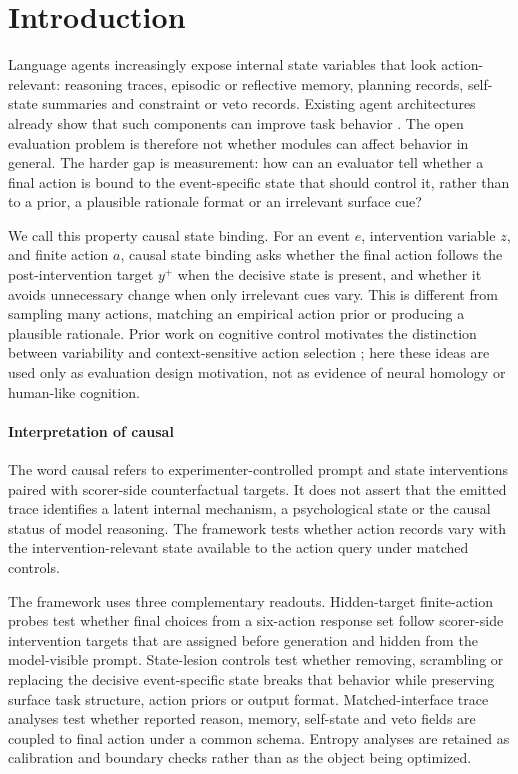 ﻿\documentclass[preprint,12pt,authoryear]{elsarticle}
\begin{document}
\section{Introduction}

Language agents increasingly expose internal state variables that look action-relevant: reasoning traces, episodic or reflective memory, planning records, self-state summaries and constraint or veto records. Existing agent architectures already show that such components can improve task behavior \citep{wei2022cot,yao2023react,shinn2023reflexion,yao2023tot,park2023generative,wang2024voyager}. The open evaluation problem is therefore not whether modules can affect behavior in general. The harder gap is measurement: how can an evaluator tell whether a final action is bound to the event-specific state that should control it, rather than to a prior, a plausible rationale format or an irrelevant surface cue?

We call this property causal state binding. For an event \(e\), intervention variable \(z\), and finite action \(a\), causal state binding asks whether the final action follows the post-intervention target \(y^{+}\) when the decisive state is present, and whether it avoids unnecessary change when only irrelevant cues vary. This is different from sampling many actions, matching an empirical action prior or producing a plausible rationale. Prior work on cognitive control motivates the distinction between variability and context-sensitive action selection \citep{miller2001integrative,logan1984inhibit,aron2014inhibition,shenhav2013expected}; here these ideas are used only as evaluation design motivation, not as evidence of neural homology or human-like cognition.

\paragraph{Interpretation of causal}
The word causal refers to experimenter-controlled prompt and state interventions paired with scorer-side counterfactual targets. It does not assert that the emitted trace identifies a latent internal mechanism, a psychological state or the causal status of model reasoning. The framework tests whether action records vary with the intervention-relevant state available to the action query under matched controls.

The framework uses three complementary readouts. Hidden-target finite-action probes test whether final choices from a six-action response set follow scorer-side intervention targets that are assigned before generation and hidden from the model-visible prompt. State-lesion controls test whether removing, scrambling or replacing the decisive event-specific state breaks that behavior while preserving surface task structure, action priors or output format. Matched-interface trace analyses test whether reported reason, memory, self-state and veto fields are coupled to final action under a common schema. Entropy analyses are retained as calibration and boundary checks rather than as the object being optimized.
\end{document}
